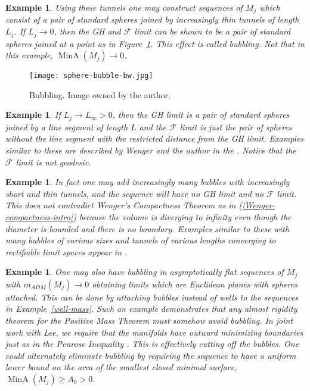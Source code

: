 \documentclass[12pt]{amsart}
\newtheorem{example}[thm]{Example}
\begin{document}
\begin{example}\label{tunnel-sphere}
Using these tunnels one may construct sequences of $M_j$
which consist of a pair of standard spheres joined by increasingly thin
tunnels of length $L_j$.  
If $L_j \to 0$, then the GH and $\mathcal{F}$
limit can be shown to be a pair of standard spheres joined at a point
as in Figure~\ref{fig-bubbling}.   This effect is called {\em bubbling}.  
Not that in this example, ${\operatorname{MinA}}(M_j) \to 0$.
\end{example}

\begin{figure}[htbp]
\begin{center}
\texttt{[image: sphere-bubble-bw.jpg]}
\caption{Bubbling.    Image owned by the author.}
\label{fig-bubbling}
\end{center}
\end{figure}

\begin{example}\label{ex-not-geod}
If $L_j \to L_\infty>0$, then the GH limit is a pair of standard spheres
joined by a line segment of length $L$ and the $\mathcal{F}$ limit
is just the pair of spheres without the line segment with the restricted 
distance from the GH limit.   Examples similar to these are described
by Wenger and the author in the \cite{SorWen2}.   Notice that the
$\mathcal{F}$ limit is not geodesic.
\end{example}

\begin{example}\label{ex-lots-bubbles}
In fact one may add increasingly many
bubbles with increasingly short and thin tunnels, and the sequence
will have no GH limit and no $\mathcal{F}$ limit.  This does not contradict
Wenger's Compactness Theorem as in (\ref{Wenger-compactness-intro}) 
because the volume is diverging to
infinity even though the diameter is bounded and there is no boundary.
Examples similar to these
with many bubbles of various sizes and tunnels of various lengths
converging to rectifiable limit spaces appear in \cite{SorWen2}.
\end{example}

\begin{example} \label{tunnel-mass}
One may also have bubbling in asymptotically flat sequences of $M_j$
with $m_{ADM}(M_j) \to 0$ obtaining limits which are
Euclidean planes with spheres attached.   This can be done by attaching
bubbles instead of wells to the sequences in Example~\ref{well-mass}.
Such an example demonstrates that any almost rigidity theorem for
the Positive Mass Theorem must somehow avoid bubbling.  In
joint work with Lee, we require that the manifolds have outward minimizing
boundaries just as in the Penrose Inequality \cite{LeeSormani1}.
This is effectively cutting off the bubbles.  One could alternately 
eliminate bubbling
by requiring the sequence to have a uniform lower bound on
the area of the smallest closed minimal surface, ${\operatorname{MinA}}(M_j)\ge A_0>0$. 
\end{example}
\end{document}
